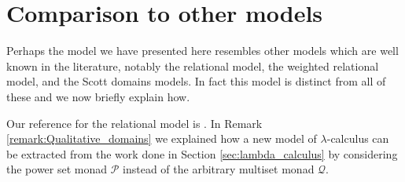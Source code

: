 \documentclass[runningheads]{llncs}
\newcommand{\call}[1]{\mathcal{#1}}
\newcommand{\Qcal}{\call{Q}}
\begin{document}
\section{Comparison to other models}
Perhaps the model we have presented here resembles other models which are well known in the literature, notably the relational model, the weighted relational model, and the Scott domains models. In fact this model is distinct from all of these and we now briefly explain how. 

Our reference for the relational model is \cite[Section 5.1]{Manzonetto}. In Remark \ref{remark:Qualitative_domains} we explained how a new model of $\lambda$-calculus can be extracted from the work done in Section \ref{sec:lambda_calculus} by considering the power set monad $\call{P}$ instead of the arbitrary multiset monad $\Qcal$. 

\appendix
\end{document}
